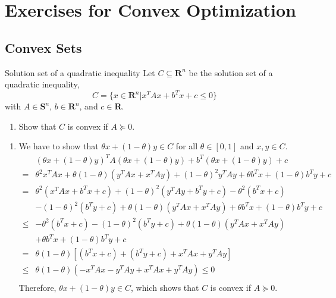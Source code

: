 \chapter{Exercises for Convex Optimization}

\section{Convex Sets}

\begin{exercise}{Solution set of a quadratic inequality}
    Let $C\subseteq\mathbf{R}^{n}$ be the solution set of a quadratic inequality,
    \begin{equation*}
        C=\{x\in\mathbf{R}^{n}\vert x^{T}Ax+b^{T}x+c\leq 0\}
    \end{equation*}
    with $A\in\mathbf{S}^{n}$, $b\in\mathbf{R}^{n}$, and $c\in\mathbf{R}$.
    \begin{enumerate}
        \item Show that $C$ is convex if $A\succeq 0$.
    \end{enumerate}
\end{exercise}

\begin{solution}
    \begin{enumerate}
        \item 
        We have to show that $\theta x+(1-\theta)y\in C$ for all $\theta\in[0,1]$ and $x,y\in C$.
        \begin{equation*}
            \begin{aligned}
                &(\theta x+(1-\theta)y)^{T}A(\theta x+(1-\theta)y)+b^{T}(\theta x+(1-\theta)y)+c\\
                =&\theta^2x^TAx+\theta(1-\theta)(y^TAx+x^TAy)+(1-\theta)^2y^TAy+\theta b^Tx+(1-\theta)b^Ty+c\\
                =&\theta^2(x^{T}Ax+b^{T}x+c)+(1-\theta)^2(y^{T}Ay+b^{T}y+c)-\theta^2(b^{T}x+c)\\
                &-(1-\theta)^2(b^{T}y+c)+\theta(1-\theta)(y^TAx+x^TAy)+\theta b^Tx+(1-\theta)b^Ty+c\\
                \leq&-\theta^2(b^{T}x+c)-(1-\theta)^2(b^{T}y+c)+\theta(1-\theta)(y^TAx+x^TAy)\\
                &+\theta b^Tx+(1-\theta)b^Ty+c\\
                =&\theta(1-\theta)[(b^Tx+c)+(b^Ty+c)+x^TAx+y^TAy]\\
                \leq&\theta(1-\theta)(-x^TAx-y^TAy+x^TAx+y^TAy)\leq 0\\
            \end{aligned}
        \end{equation*}
        Therefore, $\theta x+(1-\theta)y\in C$, which shows that $C$ is convex if $A\succeq 0$.
    \end{enumerate}
    
\end{solution}